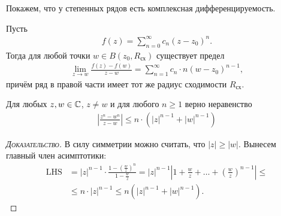 \documentclass[../../main.tex]{subfiles}
\begin{document}
Покажем, что у степенных рядов есть комплексная дифференцируемость.

\begin{crly}
 \label{corollary:complex_differential_of_}
 Пусть
 \begin{align*}
  f(z) = \sum_{n=0}^{\infty} c_n(z - z_0)^{n}.
 \end{align*} Тогда для любой точки $w \in B(z_0, R_{\text{сх}})$ существует предел
 \begin{align*}
  \lim_{z \to w} \frac{f(z) - f(w)}{z - w} = \sum_{n=1}^{\infty} c_n \cdot n (w - z_0)^{n-1},
 \end{align*} причём ряд в правой части имеет тот же радиус сходимости $R_{\text{сх}}$.
\end{crly}
\begin{lm}
 \label{lemma:complex_n_w_inequality}
 Для любых $z, w \in \mathbb{C}$, $z \neq w$ и для любого $n \geqslant 1$ верно неравенство
 \begin{align*}
  \left|\frac{z^{n} - w^{n}}{z - w} \right| \leqslant n \cdot \left(\left| z \right|^{n-1} + \left| w \right|^{n-1}\right)
 \end{align*} 
\end{lm}
\begin{proof}[\normalfont\textsc{Доказательство}]
 В силу симметрии можно считать, что $\left| z \right| \geqslant \left| w \right|$. Вынесем главный член асимптотики:
 \begin{align*}
  \mathrm{LHS} &= \left| z \right|^{n-1} \cdot \frac{1 - \left( \frac{w}{z} \right)^{n}}{1 - \frac{w}{z}} = \left| z \right|^{n-1} \left| 1 + \frac{w}{z} + \ldots + \left( \frac{w}{z} \right)^{n-1} \right| \leqslant \\
  &\leqslant n \cdot \left| z \right|^{n-1} \leqslant n \left( \left| z \right|^{n-1} + \left| w \right|^{n-1} \right).
 \end{align*} 
\end{proof}
\end{document}
